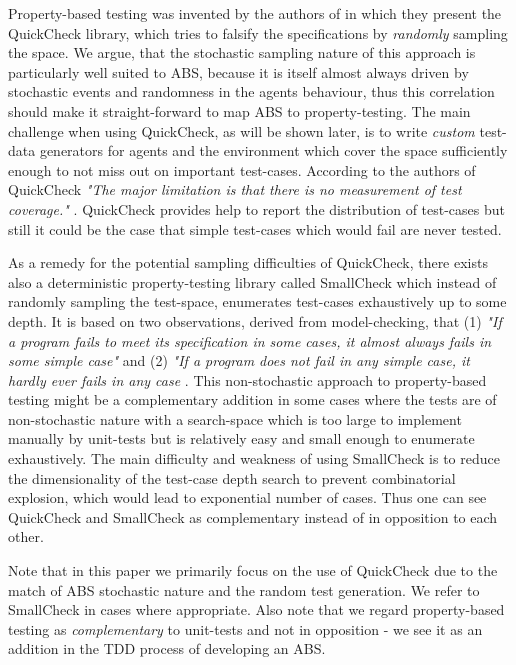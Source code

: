 Property-based testing was invented by the authors of \cite{claessen_quickcheck_2000,claessen_testing_2002} in which they present the QuickCheck library, which tries to falsify the specifications by \textit{randomly} sampling the space. We argue, that the stochastic sampling nature of this approach is particularly well suited to ABS, because it is itself almost always driven by stochastic events and randomness in the agents behaviour, thus this correlation should make it straight-forward to map ABS to property-testing. The main challenge when using QuickCheck, as will be shown later, is to write \textit{custom} test-data generators for agents and the environment which cover the space sufficiently enough to not miss out on important test-cases. According to the authors of QuickCheck \textit{"The major limitation is that there is no measurement of test coverage."} \cite{claessen_quickcheck_2000}. QuickCheck provides help to report the distribution of test-cases but still it could be the case that simple test-cases which would fail are never tested.

As a remedy for the potential sampling difficulties of QuickCheck, there exists also a deterministic property-testing library called SmallCheck \cite{runciman_smallcheck_2008} which instead of randomly sampling the test-space, enumerates test-cases exhaustively up to some depth. It is based on two observations, derived from model-checking, that (1) \textit{"If a program fails to meet its specification in some cases, it almost always fails in some simple case"} and (2) \textit{"If a program does not fail in any simple case, it hardly ever fails in any case} \cite{runciman_smallcheck_2008}. This non-stochastic approach to property-based testing might be a complementary addition in some cases where the tests are of non-stochastic nature with a search-space which is too large to implement manually by unit-tests but is relatively easy and small enough to enumerate exhaustively. The main difficulty and weakness of using SmallCheck is to reduce the dimensionality of the test-case depth search to prevent combinatorial explosion, which would lead to exponential number of cases. Thus one can see QuickCheck and SmallCheck as complementary instead of in opposition to each other.

Note that in this paper we primarily focus on the use of QuickCheck due to the match of ABS stochastic nature and the random test generation. We refer to SmallCheck in cases where appropriate. Also note that we regard property-based testing as \textit{complementary} to unit-tests and not in opposition - we see it as an addition in the TDD process of developing an ABS.

